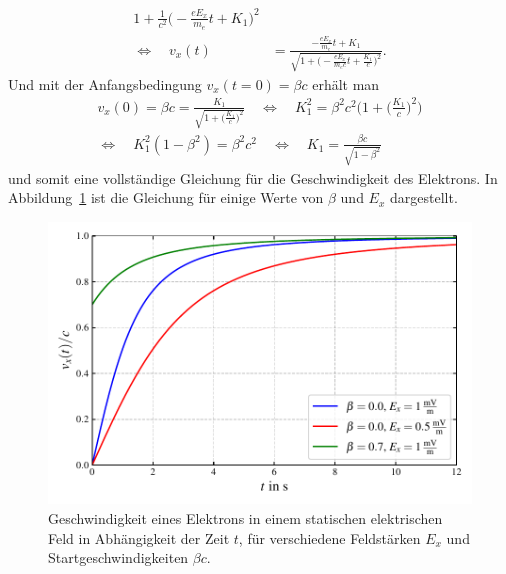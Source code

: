 \begin{beispiel}
\begin{align*}
    {1 + \frac{1}{c^2}\biggl(-\frac{e E_x}{m_e}t + K_1\biggr)^2}\\
    \Leftrightarrow\quad
    v_x(t) &= \frac{-\frac{e E_x}{m_e}t + K_1}
    {\sqrt{1+\biggl(-\frac{eE_x}{m_e c}t+\frac{K_1}{c}\biggr)^2}}.
\end{align*}
Und mit der Anfangsbedingung \(v_x(t=0)=\beta c\) erhält man
\begin{multline*}
    v_x(0) = \beta c = \frac{K_1}{\sqrt{1+\biggl(\frac{K_1}{c}\biggr)^2}}\quad
    \Leftrightarrow\quad K_1^2 = \beta^2 c^2 \Biggl(1+\Biggl(\frac{K_1}{c}\Biggr)^2\Biggr)\\
    \Leftrightarrow\quad K_1^2 (1-\beta^2) = \beta^2 c^2\quad
    \Leftrightarrow\quad K_1 = \frac{\beta c}{\sqrt{1-\beta^2}}
\end{multline*}
und somit eine vollständige Gleichung für die Geschwindigkeit des Elektrons.
In Abbildung~\ref{relativ:fig:elektron-em-feld} ist die Gleichung für einige
Werte von \(\beta\) und \(E_x\) dargestellt.
\begin{figure}
    \centering
    \includegraphics[width=0.8\linewidth]{papers/relativ/images/elektron_e-feld.pdf}
    \caption{Geschwindigkeit eines Elektrons in einem
    statischen elektrischen Feld in Abhängigkeit der Zeit \(t\),
    für verschiedene Feldstärken \(E_x\) und Startgeschwindigkeiten \(\beta c\).
    \label{relativ:fig:elektron-em-feld}}
\end{figure}


\end{beispiel}
